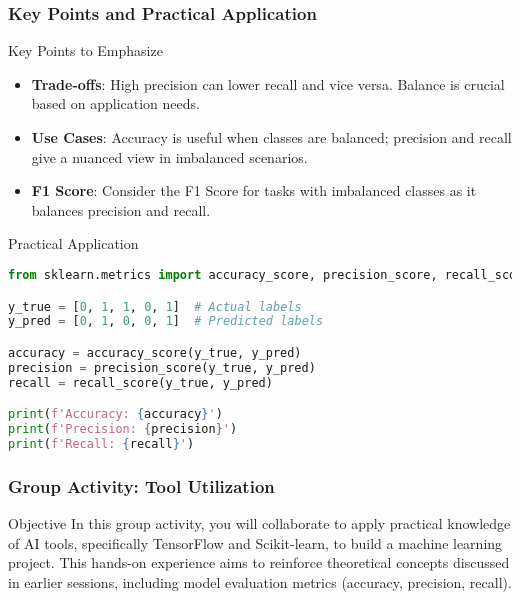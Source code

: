\documentclass[aspectratio=169]{beamer}
\begin{document}
\begin{frame}[fragile]
    \frametitle{Key Points and Practical Application}
    \begin{block}{Key Points to Emphasize}
        \begin{itemize}
            \item \textbf{Trade-offs}: High precision can lower recall and vice versa. Balance is crucial based on application needs.
            \item \textbf{Use Cases}: Accuracy is useful when classes are balanced; precision and recall give a nuanced view in imbalanced scenarios.
            \item \textbf{F1 Score}: Consider the F1 Score for tasks with imbalanced classes as it balances precision and recall.
        \end{itemize}
    \end{block}

    \begin{block}{Practical Application}
        \begin{lstlisting}[language=Python, frame=single]
from sklearn.metrics import accuracy_score, precision_score, recall_score

y_true = [0, 1, 1, 0, 1]  # Actual labels
y_pred = [0, 1, 0, 0, 1]  # Predicted labels

accuracy = accuracy_score(y_true, y_pred)
precision = precision_score(y_true, y_pred)
recall = recall_score(y_true, y_pred)

print(f'Accuracy: {accuracy}')
print(f'Precision: {precision}')
print(f'Recall: {recall}')
        \end{lstlisting}
    \end{block}
\end{frame}

\begin{frame}
    \frametitle{Group Activity: Tool Utilization}
    \begin{block}{Objective}
        In this group activity, you will collaborate to apply practical knowledge of AI tools, specifically TensorFlow and Scikit-learn, to build a machine learning project. This hands-on experience aims to reinforce theoretical concepts discussed in earlier sessions, including model evaluation metrics (accuracy, precision, recall).
    \end{block}
\end{frame}
\end{document}
